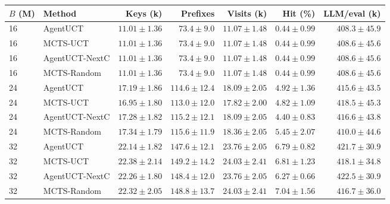 \begin{tabular}{@{}llrrrrr@{}}
\toprule
$B$ (M) & Method & Keys (k) & Prefixes & Visits (k) & Hit (\%) & LLM/eval (k) \\
\midrule
16 & AgentUCT & $11.01 \pm 1.36$ & $73.4 \pm 9.0$ & $11.07 \pm 1.48$ & $0.44 \pm 0.99$ & $408.3 \pm 45.9$ \\
16 & MCTS-UCT & $11.01 \pm 1.36$ & $73.4 \pm 9.0$ & $11.07 \pm 1.48$ & $0.44 \pm 0.99$ & $408.6 \pm 45.6$ \\
16 & AgentUCT-NextC & $11.01 \pm 1.36$ & $73.4 \pm 9.0$ & $11.07 \pm 1.48$ & $0.44 \pm 0.99$ & $408.6 \pm 45.6$ \\
16 & MCTS-Random & $11.01 \pm 1.36$ & $73.4 \pm 9.0$ & $11.07 \pm 1.48$ & $0.44 \pm 0.99$ & $408.6 \pm 45.6$ \\
24 & AgentUCT & $17.19 \pm 1.86$ & $114.6 \pm 12.4$ & $18.09 \pm 2.05$ & $4.92 \pm 1.36$ & $415.6 \pm 43.5$ \\
24 & MCTS-UCT & $16.95 \pm 1.80$ & $113.0 \pm 12.0$ & $17.82 \pm 2.00$ & $4.82 \pm 1.09$ & $418.5 \pm 45.3$ \\
24 & AgentUCT-NextC & $17.28 \pm 1.82$ & $115.2 \pm 12.1$ & $18.09 \pm 2.05$ & $4.40 \pm 0.83$ & $416.6 \pm 43.8$ \\
24 & MCTS-Random & $17.34 \pm 1.79$ & $115.6 \pm 11.9$ & $18.36 \pm 2.05$ & $5.45 \pm 2.07$ & $410.0 \pm 44.6$ \\
32 & AgentUCT & $22.14 \pm 1.82$ & $147.6 \pm 12.1$ & $23.76 \pm 2.05$ & $6.79 \pm 0.82$ & $421.7 \pm 30.9$ \\
32 & MCTS-UCT & $22.38 \pm 2.14$ & $149.2 \pm 14.2$ & $24.03 \pm 2.41$ & $6.81 \pm 1.23$ & $418.1 \pm 34.8$ \\
32 & AgentUCT-NextC & $22.26 \pm 1.80$ & $148.4 \pm 12.0$ & $23.76 \pm 2.05$ & $6.27 \pm 0.66$ & $422.5 \pm 30.9$ \\
32 & MCTS-Random & $22.32 \pm 2.05$ & $148.8 \pm 13.7$ & $24.03 \pm 2.41$ & $7.04 \pm 1.56$ & $416.7 \pm 36.0$ \\
\bottomrule
\end{tabular}
